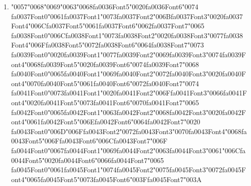 \documentclass[11pt]{article}
\begin{document}
\begin{enumerate}[leftmargin=*]
  \item {\char"0057}{\char"0068}{\char"0069}{\char"0063}{\char"0068}{\csname fa0036Font5\endcsname\char"0020}{\csname fa0036Font6\endcsname\char"0074} {\csname fa0037Font0\endcsname\char"0061}{\csname fa0037Font1\endcsname\char"0073}{\csname fa0037Font2\endcsname\char"006B}{\csname fa0037Font3\endcsname\char"0020}{\csname fa0037Font4\endcsname\char"006C}{\csname fa0037Font5\endcsname\char"0061}{\csname fa0037Font6\endcsname\char"0062}{\csname fa0037Font7\endcsname\char"0065} {\csname fa0038Font0\endcsname\char"006C}{\csname fa0038Font1\endcsname\char"0073}{\csname fa0038Font2\endcsname\char"0020}{\csname fa0038Font3\endcsname\char"0077}{\csname fa0038Font4\endcsname\char"006F}{\csname fa0038Font5\endcsname\char"0072}{\csname fa0038Font6\endcsname\char"0064}{\csname fa0038Font7\endcsname\char"0073} {\csname fa0039Font0\endcsname\char"0020}{\csname fa0039Font1\endcsname\char"0077}{\csname fa0039Font2\endcsname\char"0069}{\csname fa0039Font3\endcsname\char"0074}{\csname fa0039Font4\endcsname\char"0068}{\csname fa0039Font5\endcsname\char"0020}{\csname fa0039Font6\endcsname\char"0074}{\csname fa0039Font7\endcsname\char"0068} {\csname fa0040Font0\endcsname\char"0065}{\csname fa0040Font1\endcsname\char"0069}{\csname fa0040Font2\endcsname\char"0072}{\csname fa0040Font3\endcsname\char"0020}{\csname fa0040Font4\endcsname\char"0070}{\csname fa0040Font5\endcsname\char"0061}{\csname fa0040Font6\endcsname\char"0072}{\csname fa0040Font7\endcsname\char"0074} {\csname fa0041Font0\endcsname\char"0073}{\csname fa0041Font1\endcsname\char"0020}{\csname fa0041Font2\endcsname\char"006F}{\csname fa0041Font3\endcsname\char"0066}{\csname fa0041Font4\endcsname\char"0020}{\csname fa0041Font5\endcsname\char"0073}{\csname fa0041Font6\endcsname\char"0070}{\csname fa0041Font7\endcsname\char"0065} {\csname fa0042Font0\endcsname\char"0065}{\csname fa0042Font1\endcsname\char"0063}{\csname fa0042Font2\endcsname\char"0068}{\csname fa0042Font3\endcsname\char"0020}{\csname fa0042Font4\endcsname\char"0061}{\csname fa0042Font5\endcsname\char"006E}{\csname fa0042Font6\endcsname\char"0064}{\csname fa0042Font7\endcsname\char"0020} {\csname fa0043Font0\endcsname\char"006D}{\char"006F}{\csname fa0043Font2\endcsname\char"0072}{\csname fa0043Font3\endcsname\char"0070}{\csname fa0043Font4\endcsname\char"0068}{\csname fa0043Font5\endcsname\char"006F}{\csname fa0043Font6\endcsname\char"006C}{\csname fa0043Font7\endcsname\char"006F} {\csname fa0044Font0\endcsname\char"0067}{\csname fa0044Font1\endcsname\char"0069}{\csname fa0044Font2\endcsname\char"0063}{\csname fa0044Font3\endcsname\char"0061}{\char"006C}{\csname fa0044Font5\endcsname\char"0020}{\csname fa0044Font6\endcsname\char"0066}{\csname fa0044Font7\endcsname\char"0065} {\csname fa0045Font0\endcsname\char"0061}{\csname fa0045Font1\endcsname\char"0074}{\csname fa0045Font2\endcsname\char"0075}{\csname fa0045Font3\endcsname\char"0072}{\csname fa0045Font4\endcsname\char"0065}{\csname fa0045Font5\endcsname\char"0073}{\csname fa0045Font6\endcsname\char"003F}{\csname fa0045Font7\endcsname\char"003A}

\end{enumerate}
\end{document}
